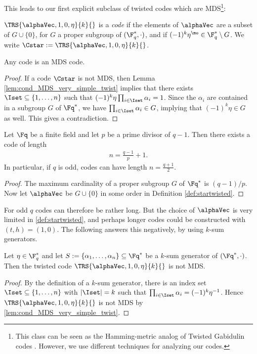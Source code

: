 \documentclass[conference,a4paper]{IEEEtran}
\begin{document}
This leads to our first explicit subclass of twisted codes which are MDS\footnote{%
  This class can be seen as the Hamming-metric analog of Twisted Gabidulin codes \cite{sheekey_new_2015}. However, we use different techniques for analyzing our codes.}:
\begin{definition}\label{def:startwisted}
  $\TRS{\alphaVec,1,0,\eta}{k}{}$ is a \emph{\startw code} if the elements of $\alphaVec$ are a subset of $G \cup \{ 0 \}$, for $G$ a proper subgroup of $(\F_q^*, \cdot)$, and if $(-1)^k \eta^\mo \in \F_q^* \setminus G$.
  We write $\Cstar := \TRS{\alphaVec,1,0,\eta}{k}{}$.
\end{definition}

\begin{theorem}\label{thm:MDS_property_simple_twist}
Any \startw code is an MDS code.
\end{theorem}
\begin{proof}
If a \startw code $\Cstar$ is not MDS, then Lemma \ref{lem:cond_MDS_very_simple_twist} implies that there exists $\Iset \subseteq \{1,\dots,n\}$ such that $(-1)^k\eta\prod_{i \in \Iset} \alpha_i =1$. Since the $\alpha_i$ are contained in a subgroup $G$ of $\Fq^*$, we have $\prod_{i \in \Iset} \alpha_i \in G$, implying that $(-1)^k\eta \in G$ as well. This gives a contradiction.
\end{proof}

\begin{corollary}\label{cor:MDS_primitively-twisted}
Let $\Fq$ be a finite field and let $p$ be a prime divisor of $q-1$. Then there exists a \startw code of length
\begin{align*}
n = \tfrac{q-1}{p}+1.
\end{align*}
In particular, if $q$ is odd, \startw codes can have length $n = \frac{q+1}{2}$.
\end{corollary}
\begin{proof}
The maximum cardinality of a proper subgroup $G$ of $\Fq^*$ is $(q-1)/p$. Now let $\alphaVec$ be $G \cup \{0\}$ in some order in Definition \ref{def:startwisted}.
\end{proof}

For odd $q$ \startw codes can therefore be rather long.
But the choice of $\alphaVec$ is very limited in \cref{def:startwisted}, and perhaps longer codes could be constructed with $(t,h) = (1,0)$.
The following answers this negatively, by using $k$-sum generators.
\begin{lemma}\label{lem:k_sum_gen_star_MDS}
Let $\eta \in \F_q^*$ and let $S := \{\alpha_1,\dots,\alpha_n\} \subseteq \Fq^*$ be a $k$-sum generator of $(\Fq^*,\cdot )$.
Then the twisted code $\TRS{\alphaVec,1,0,\eta}{k}{}$ is not MDS.
\end{lemma}
\begin{proof}
By the definition of a $k$-sum generator, there is an index set $\Iset \subseteq \{1,\dots,n\}$ with $|\Iset| = k$ such that $\prod_{i \in \Iset} \alpha_i = (-1)^k \eta^{-1}$.
Hence $\TRS{\alphaVec,1,0,\eta}{k}{}$ is not MDS by \cref{lem:cond_MDS_very_simple_twist}.
\end{proof}
\end{document}
